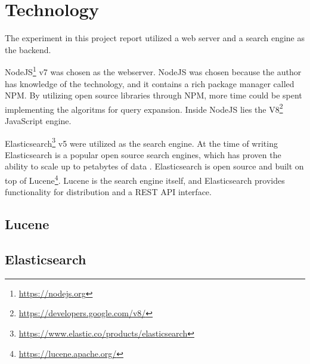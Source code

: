 \section{Technology}
The experiment in this project report utilized a web server and a search engine as the backend.

NodeJS\footnote{\url{https://nodejs.org}} v7 was chosen as the webserver.
NodeJS was chosen because the author has knowledge of the technology,
and it contains a rich package manager called NPM.
By utilizing open source libraries through NPM, more time could be spent implementing the algoritms for query expansion.
Inside NodeJS lies the V8\footnote{\url{https://developers.google.com/v8/}} JavaScript engine.

Elasticsearch\footnote{\url{https://www.elastic.co/products/elasticsearch}} v5 were utilized as the search engine.
At the time of writing Elasticsearch is a popular open source search engines, which has proven the ability to scale up to petabytes of data \cite{elasticsearch-scale}.
Elasticsearch is open source and built on top of Lucene\footnote{\url{https://lucene.apache.org/}}.
Lucene is the search engine itself,
and Elasticsearch provides functionality for distribution and a REST API interface.

\subsection{Lucene}

\subsection{Elasticsearch}
